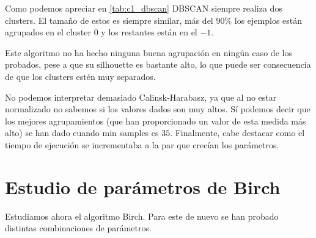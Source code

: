 Como podemos apreciar en \eqref{tab:c1_dbscan} DBSCAN siempre realiza dos clusters. El tamaño de estos es siempre similar, más del $90\%$ los ejemplos están agrupados en el cluster $0$ y los restantes están en el $-1$.

Este algoritmo no ha hecho ninguna buena agrupación en ningún caso de los probados, pese a que su silhouette es bastante alto, lo que puede ser consecuencia de que los clusters estén muy separados.

No podemos interpretar demasiado Calinsk-Harabasz, ya que al no estar normalizado no sabemos si los valores dados son muy altos. Sí podemos decir que los mejores agrupamientos (que han proporcionado un valor de esta medida más alto) se han dado cuando min samples es $35$.
Finalmente, cabe destacar como el tiempo de ejecución se incrementaba a la par que crecían los parámetros.


\section{Estudio de parámetros de Birch}

Estudiamos ahora el algoritmo Birch. Para este de nuevo se han probado distintas combinaciones de parámetros.

